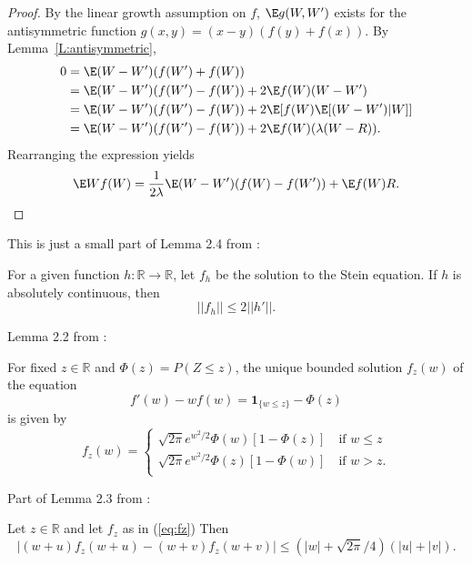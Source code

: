 \begin{proof}
  By the linear growth assumption on $f$, $\E g(W, W')$ exists for the antisymmetric function
  $g(x,y) = (x-y)(f(y)+f(x))$.  By Lemma~\ref{L:antisymmetric},
  \begin{equation*}
    \begin{split}
      0 &= \E (W-W')(f(W')+f(W)) \\
      &= \E (W-W')(f(W')-f(W)) + 2\E f(W)(W-W') \\
      &= \E (W-W')(f(W')-f(W)) + 2\E [f(W)\E [(W-W')|W]] \\
      &= \E (W-W')(f(W')-f(W)) + 2\E f(W)(\lambda (W-R)).
    \end{split}
  \end{equation*}
  Rearranging the expression yields
  \begin{equation}
    \E Wf(W) = \frac{1}{2\lambda} \E (W-W')(f(W)-f(W')) + \E f(W)R.
  \end{equation}
\end{proof}

This is just a small part of Lemma 2.4 from \cite{chen2010normal}:
\begin{lemma}
  \label{L:stein-eq-sol-bound}
  For a given function $h: \mathbb{R} \to \mathbb{R}$, let $f_h$ be the solution to the Stein
  equation.  If $h$ is absolutely continuous, then
  \begin{equation}
    ||f_h|| \leq 2 ||h'||.
  \end{equation}
\end{lemma}

Lemma 2.2 from \cite{chen2010normal}:
\begin{lemma}
  \label{L:stein-eq-sol}
  For fixed $z \in \mathbb{R}$ and $\Phi(z) = P(Z \leq z)$, the unique bounded solution
$f_z(w)$ of the equation
  \begin{equation}
    \label{eq:stein-eq}
    f'(w) - wf(w) = \mathbf{1}_{\{w \leq z\}} - \Phi(z)
  \end{equation}
  is given by
  \begin{equation}
    \label{eq:fz}
    f_z(w) =
    \begin{cases}
      \sqrt{2 \pi} e^{w^2/2} \Phi(w)[1-\Phi(z)] \quad \text{if } w \leq z \\
      \sqrt{2 \pi} e^{w^2/2} \Phi(z)[1-\Phi(w)] \quad \text{if } w > z. \\
    \end{cases}
  \end{equation}
\end{lemma}

Part of Lemma 2.3 from \cite{chen2010normal}:
\begin{lemma}
  \label{L:stein-eq-sol-bound2}
  Let $z \in \mathbb{R}$ and let $f_z$ as in (\ref{eq:fz})
    Then
    \begin{equation*}
      |(w + u)f_z(w + u) - (w + v)f_z(w + v)| \leq
      (|w| + \sqrt{2 \pi} / 4)(|u| + |v|).
    \end{equation*}
\end{lemma}
